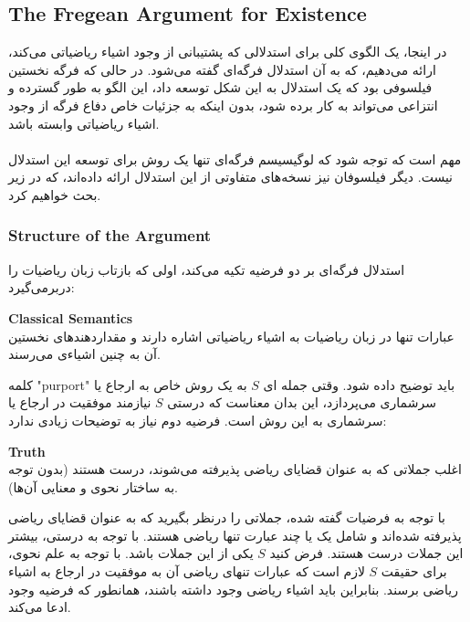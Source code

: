 \documentclass[10pt,a4paper]{article}
\begin{document}
                \subsection{The Fregean Argument for Existence}
در اینجا، یک الگوی کلی برای استدلالی که پشتیبانی از وجود اشیاء ریاضیاتی می‌کند، ارائه می‌دهیم، که به آن استدلال فرگه‌ای گفته می‌شود. در حالی که فرگه نخستین فیلسوفی بود که یک استدلال به این شکل توسعه داد، این الگو به طور گسترده و انتزاعی می‌تواند به کار برده شود، بدون اینکه به جزئیات خاص دفاع فرگه از وجود اشیاء ریاضیاتی وابسته باشد.
                    \\
                    \\
مهم است که توجه شود که لوگیسیسم فرگه‌ای تنها یک روش برای توسعه این استدلال نیست. دیگر فیلسوفان نیز نسخه‌های متفاوتی از این استدلال ارائه داده‌اند، که در زیر بحث خواهیم کرد.
                    \subsubsection{Structure of the Argument}
استدلال فرگه‌ای بر دو فرضیه تکیه می‌کند، اولی که بازتاب زبان ریاضیات را دربرمی‌گیرد:
                        \begin{qt}
                            \textbf{Classical Semantics}
                            \\
عبارات تنها در زبان ریاضیات به اشیاء ریاضیاتی اشاره دارند و مقداردهندهای نخستین آن به چنین اشیاءی می‌رسند.
                        \end{qt}
کلمه "purport" باید توضیح داده شود. وقتی جمله ای $S$ به یک روش خاص به ارجاع یا سرشماری می‌پردازد، این بدان معناست که درستی $S$ نیازمند موفقیت در ارجاع یا سرشماری به این روش است. فرضیه دوم نیاز به توضیحات زیادی ندارد:
                        \begin{qt}
                            \textbf{Truth}
                            \\
اغلب جملاتی که به عنوان قضایای ریاضی پذیرفته می‌شوند، درست هستند (بدون توجه به ساختار نحوی و معنایی آن‌ها).
                        \end{qt}
با توجه به فرضیات گفته شده، جملاتی را درنظر بگیرید که به عنوان قضایای ریاضی پذیرفته شده‌اند و شامل یک یا چند عبارت تنها ریاضی هستند. با توجه به درستی، بیشتر این جملات درست هستند. فرض کنید $S$ یکی از این جملات باشد. با توجه به علم نحوی، برای حقیقت $S$ لازم است که عبارات تنهای ریاضی آن به موفقیت در ارجاع به اشیاء ریاضی برسند. بنابراین باید اشیاء ریاضی وجود داشته باشند، همانطور که فرضیه وجود ادعا می‌کند.
\end{document}
